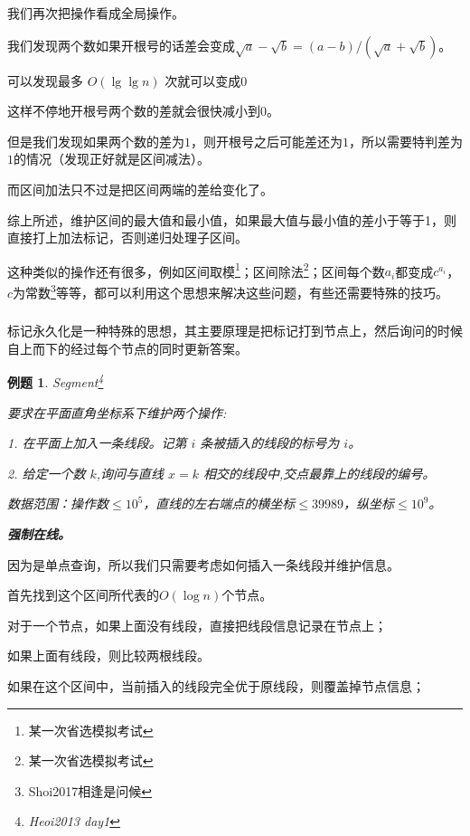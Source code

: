 \documentclass[a4paper]{article}
\newcommand{\kai}{\CJKfamily{kai}}
\newtheorem{problem}{例题}
\begin{document}
我们再次把操作看成全局操作。

我们发现两个数如果开根号的话差会变成$\sqrt{a}-\sqrt{b}=(a-b)/(\sqrt{a}+\sqrt{b})$。

可以发现最多 $O(\lg \lg n)$ 次就可以变成$0$

这样不停地开根号两个数的差就会很快减小到$0$。

但是我们发现如果两个数的差为$1$，则开根号之后可能差还为$1$，所以需要特判差为$1$的情况（发现正好就是区间减法）。

而区间加法只不过是把区间两端的差给变化了。

综上所述，维护区间的最大值和最小值，如果最大值与最小值的差小于等于1，则直接打上加法标记，否则递归处理子区间。

\bigskip

这种类似的操作还有很多，例如区间取模\footnote{某一次省选模拟考试}；区间除法\footnote{某一次省选模拟考试}；区间每个数$a_i$都变成$c^{a_i}$，$c$为常数\footnote{Shoi2017相逢是问候}等等，都可以利用这个思想来解决这些问题，有些还需要特殊的技巧。

\subsubsection{\kai{标记永久化}}

标记永久化是一种特殊的思想，其主要原理是把标记打到节点上，然后询问的时候自上而下的经过每个节点的同时更新答案。

\begin{problem}
  Segment\footnote{Heoi2013 day1}

  要求在平面直角坐标系下维护两个操作:
  
  1. 在平面上加入一条线段。记第 $i$ 条被插入的线段的标号为 $i$。
  
  2. 给定一个数 $k$,询问与直线 $x = k$ 相交的线段中,交点最靠上的线段的编号。

  数据范围：操作数$\leq 10^5$，直线的左右端点的横坐标$\leq 39989$，纵坐标$\leq 10^9$。

  \bf{强制在线}。
\end{problem}

因为是单点查询，所以我们只需要考虑如何插入一条线段并维护信息。

首先找到这个区间所代表的$O(\log n)$个节点。

对于一个节点，如果上面没有线段，直接把线段信息记录在节点上；

如果上面有线段，则比较两根线段。

如果在这个区间中，当前插入的线段完全优于原线段，则覆盖掉节点信息；
\end{document}

